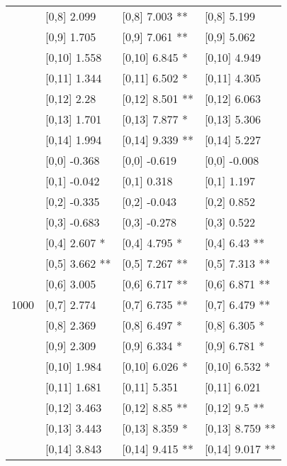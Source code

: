 \begin{table}
\begin{tabular}[t]{llll}
 & {}[0,8] 2.099 & {}[0,8] 7.003 ** & {}[0,8] 5.199\\
 & {}[0,9] 1.705 & {}[0,9] 7.061 ** & {}[0,9] 5.062\\
\addlinespace
 & {}[0,10] 1.558 & {}[0,10] 6.845 * & {}[0,10] 4.949\\
 & {}[0,11] 1.344 & {}[0,11] 6.502 * & {}[0,11] 4.305\\
 & {}[0,12] 2.28 & {}[0,12] 8.501 ** & {}[0,12] 6.063\\
 & {}[0,13] 1.701 & {}[0,13] 7.877 * & {}[0,13] 5.306\\
 & {}[0,14] 1.994 & {}[0,14] 9.339 ** & {}[0,14] 5.227\\
\addlinespace
 & {}[0,0] -0.368 & {}[0,0] -0.619 & {}[0,0] -0.008\\
 & {}[0,1] -0.042 & {}[0,1] 0.318 & {}[0,1] 1.197\\
 & {}[0,2] -0.335 & {}[0,2] -0.043 & {}[0,2] 0.852\\
 & {}[0,3] -0.683 & {}[0,3] -0.278 & {}[0,3] 0.522\\
 & {}[0,4] 2.607 * & {}[0,4] 4.795 * & {}[0,4] 6.43 **\\
\addlinespace
 & {}[0,5] 3.662 ** & {}[0,5] 7.267 ** & {}[0,5] 7.313 **\\
 & {}[0,6] 3.005 & {}[0,6] 6.717 ** & {}[0,6] 6.871 **\\
1000 & {}[0,7] 2.774 & {}[0,7] 6.735 ** & {}[0,7] 6.479 **\\
 & {}[0,8] 2.369 & {}[0,8] 6.497 * & {}[0,8] 6.305 *\\
 & {}[0,9] 2.309 & {}[0,9] 6.334 * & {}[0,9] 6.781 *\\
\addlinespace
 & {}[0,10] 1.984 & {}[0,10] 6.026 * & {}[0,10] 6.532 *\\
 & {}[0,11] 1.681 & {}[0,11] 5.351 & {}[0,11] 6.021\\
 & {}[0,12] 3.463 & {}[0,12] 8.85 ** & {}[0,12] 9.5 **\\
 & {}[0,13] 3.443 & {}[0,13] 8.359 * & {}[0,13] 8.759 **\\
 & {}[0,14] 3.843 & {}[0,14] 9.415 ** & {}[0,14] 9.017 **\\
\bottomrule
\end{tabular}
\end{table}
